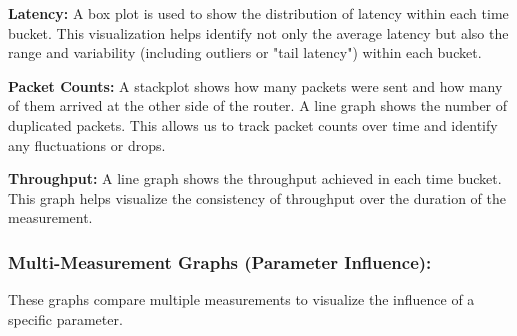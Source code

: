 \noindent\textbf{Latency:} A box plot is used to show the distribution of latency within each time bucket.
This visualization helps identify not only the average latency but also the range and variability (including outliers or "tail latency") within each bucket.

\noindent\textbf{Packet Counts:} A stackplot shows how many packets were sent and how many of them arrived at the other side of the router.
A line graph shows the number of duplicated packets.
This allows us to track packet counts over time and identify any fluctuations or drops.

\noindent\textbf{Throughput:} A line graph shows the throughput achieved in each time bucket.
This graph helps visualize the consistency of throughput over the duration of the measurement.


\subsubsection{Multi-Measurement Graphs (Parameter Influence):}
\label{sect:graphs-multi}
These graphs compare multiple measurements to visualize the influence of a specific parameter.

